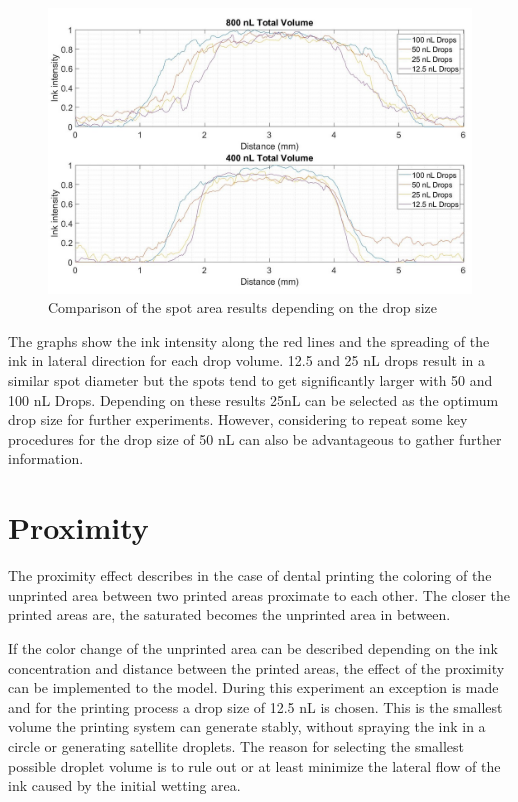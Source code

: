 \begin{figure}[H]
	\centering
	\includegraphics[width=1\textwidth]{grafiken/SpotArea.jpg}
	\caption{Comparison of the spot area results depending on the drop size}
	\label{fig:SpotArea}
\end{figure} 

\bigskip

The graphs show the ink intensity along the red lines and the spreading of the ink in lateral direction for each drop volume. 12.5 and 25 nL drops result in a similar spot diameter but the spots tend to get significantly larger with 50 and 100 nL Drops. Depending on these results 25nL can be selected as the optimum drop size for further experiments. However, considering to repeat some key procedures for the drop size of 50 nL can also be advantageous to gather further information.

\section{Proximity}

The proximity effect describes in the case of dental printing the coloring of the unprinted area between two printed areas proximate to each other. The closer the printed areas are, the saturated becomes the unprinted area in between.

If the color change of the unprinted area can be described depending on the ink concentration and distance between the printed areas, the effect of the proximity can be implemented to the model. During this experiment an exception is made and for the printing process a drop size of 12.5 nL is chosen. This is the smallest volume the printing system can generate stably, without spraying the ink in a circle or generating satellite droplets. The reason for selecting the smallest possible droplet volume is to rule out or at least minimize the lateral flow of the ink caused by the initial wetting area.  

